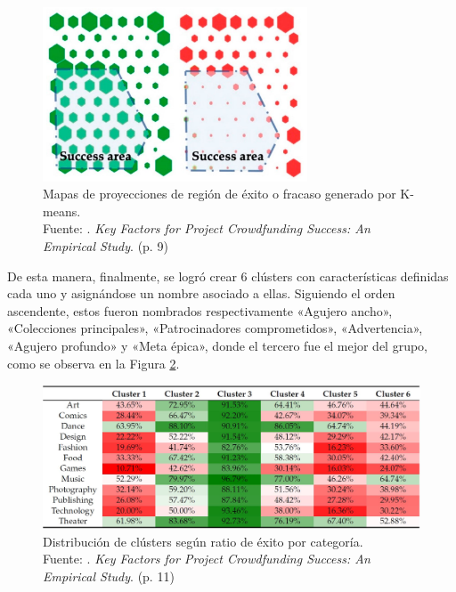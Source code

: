 \begin{figure}[!ht]
	\begin{center}
		\includegraphics[width=0.70\textwidth]{2/figures/fernandez2020_metodologia.jpg}
		\caption[Mapas de proyecciones de región de éxito o fracaso generado por K-means]{Mapas de proyecciones de región de éxito o fracaso generado por K-means.\\
		Fuente: \cite{pr_fernandezblanco2020crowdfunding_empirical}. \textit{Key Factors for Project Crowdfunding Success: An Empirical Study}. (p. 9)}
		\label{2:fig129}
	\end{center}
\end{figure}

\newpage
De esta manera, finalmente, se logró crear 6 clústers con características definidas cada uno y asignándose un nombre asociado a ellas. Siguiendo el orden ascendente, estos fueron nombrados respectivamente «Agujero ancho», «Colecciones principales», «Patrocinadores comprometidos», «Advertencia», «Agujero profundo» y «Meta épica», donde el tercero fue el mejor del grupo, como se observa en la Figura \ref{2:fig130}.

\begin{figure}[!ht]
	\begin{center}
		\includegraphics[width=1\textwidth]{2/figures/fernandez2020_clusters_categoria.jpg}
		\caption[Distribución de clústers según ratio de éxito por categoría]{Distribución de clústers según ratio de éxito por categoría.\\
			Fuente: \cite{pr_fernandezblanco2020crowdfunding_empirical}. \textit{Key Factors for Project Crowdfunding Success: An Empirical Study}. (p. 11)}
		\label{2:fig130}
	\end{center}
\end{figure}